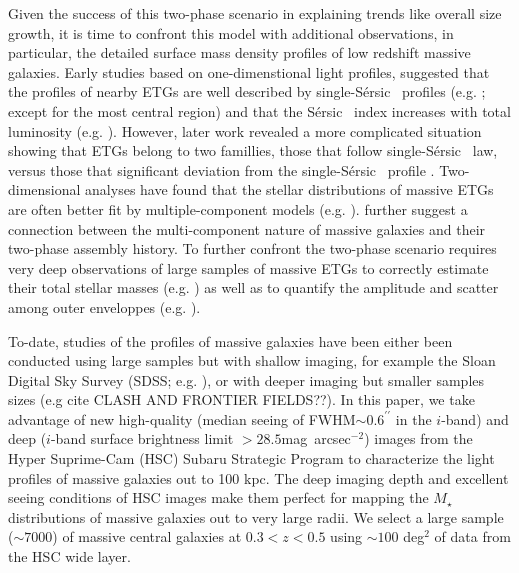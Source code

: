 \documentclass[a4paper,fleqn,usenatbib]{mnras}
\def\arcsec{{\prime\prime}}
\def\sb{mag~arcsec$^{-2}$}
\def\ser{{S\'{e}rsic\ }}
\def\redm{\texttt{redMaPPer}}
\def\mstar{{$M_{\star}$}}
\begin{document}
    Given the success of this two-phase scenario in explaining trends like overall size 
    growth, it is time to confront this model with additional observations,  in particular, the detailed surface mass density profiles of low redshift massive galaxies. Early studies based on one-dimenstional light profiles, suggested that the profiles of nearby ETGs are well described by single-\ser{} profiles (e.g. \citealt{Kormendy2009}; except for the
    most central region) and that the \ser{} index increases with total luminosity 
    (e.g. \citealt{Graham2013}). However,  later work revealed a more complicated  situation  showing  that  ETGs  belong to two famillies, those that follow single-\ser{} law, versus those that significant deviation from the single-\ser{} profile \citep{Schombert2015}. Two-dimensional analyses have found that the stellar distributions of massive ETGs are often better fit by multiple-component models 
    (e.g. \citealt{Huang2013a, Oh2017}).  \citet{Huang2013b} further suggest a connection between the multi-component 
    nature of massive galaxies and their two-phase assembly history. 
    To further confront the two-phase scenario requires very deep observations of 
    large samples of massive ETGs to correctly estimate their total stellar masses
    (e.g. \citealt{Bernardi2013, DSouza2014}) as well as to quantify the amplitude and scatter among outer enveloppes (e.g. \citealt{Capaccioli2015, Iodice2016, 
    Iodice2017}).
    
    To-date,  studies of the profiles of massive galaxies have been  either  been conducted  using large samples but with shallow imaging, for example the Sloan Digital Sky Survey (SDSS; e.g. \citealt{SDSSDR7, SDSSDR12}), or with deeper imaging  but smaller samples sizes (e.g cite CLASH AND FRONTIER FIELDS??). In this paper, we take advantage of new high-quality (median  seeing of
    FWHM${\sim} 0.6^{\arcsec}$ in the $i$-band) and deep ($i$-band surface brightness 
    limit $> 28.5$\sb) images from the Hyper Suprime-Cam (HSC) Subaru Strategic 
    Program \citep[SSP,][]{HSCDR1} to characterize the light profiles of massive galaxies out to 100 kpc. The deep imaging depth and excellent seeing conditions of HSC images make them 
    perfect for mapping the \mstar{} distributions of massive galaxies out to very 
    large radii. We select a large sample (${\sim} 7000$) of massive central galaxies at $0.3 < z < 0.5$ using ${\sim} 100$ deg$^2$ of data from the HSC wide layer. 
    
    
\end{document}
